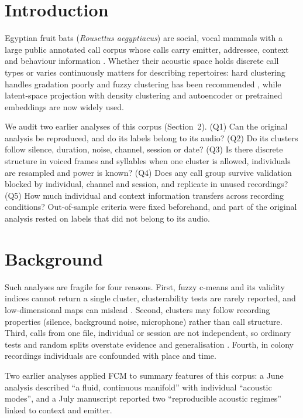 \section{Introduction}
Egyptian fruit bats (\emph{Rousettus aegyptiacus}) are social, vocal mammals with a large public annotated call corpus \cite{prat2017} whose calls carry emitter, addressee, context and behaviour information \cite{prat2016}. Whether their acoustic space holds discrete call types or varies continuously matters for describing repertoires: hard clustering handles gradation poorly and fuzzy clustering has been recommended \cite{wadewitz2015,fischer2017}, while latent-space projection with density clustering \cite{sainburg2020,thomas2022} and autoencoder or pretrained embeddings \cite{goffinet2021,best2023,aves2023,stowell2022} are now widely used.

We audit two earlier analyses of this corpus (Section~2). (Q1) Can the original analysis be reproduced, and do its labels belong to its audio? (Q2) Do its clusters follow silence, duration, noise, channel, session or date? (Q3) Is there discrete structure in voiced frames and syllables when one cluster is allowed, individuals are resampled and power is known? (Q4) Does any call group survive validation blocked by individual, channel and session, and replicate in unused recordings? (Q5) How much individual and context information transfers across recording conditions? Out-of-sample criteria were fixed beforehand, and part of the original analysis rested on labels that did not belong to its audio.

\section{Background}
Such analyses are fragile for four reasons. First, fuzzy c-means \cite{bezdek1984} and its validity indices \cite{xiebeni1991,rousseeuw1987} cannot return a single cluster, clusterability tests \cite{adolfsson2019,liu2008} are rarely reported, and low-dimensional maps can mislead \cite{chari2023}. Second, clusters may follow recording properties (silence, background noise, microphone) rather than call structure. Third, calls from one file, individual or session are not independent, so ordinary tests and random splits overstate evidence \cite{hurlbert1984} and generalisation \cite{roberts2017}. Fourth, in colony recordings individuals are confounded with place and time.

Two earlier analyses applied FCM to summary features of this corpus: a June analysis described ``a fluid, continuous manifold'' with individual ``acoustic modes'', and a July manuscript reported two ``reproducible acoustic regimes'' linked to context and emitter.
